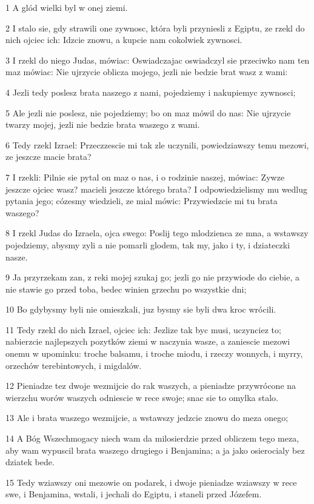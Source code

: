 \par 1 A glód wielki byl w onej ziemi.
\par 2 I stalo sie, gdy strawili one zywnosc, która byli przyniesli z Egiptu, ze rzekl do nich ojciec ich: Idzcie znowu, a kupcie nam cokolwiek zywnosci.
\par 3 I rzekl do niego Judas, mówiac: Oswiadczajac oswiadczyl sie przeciwko nam ten maz mówiac: Nie ujrzycie oblicza mojego, jezli nie bedzie brat wasz z wami:
\par 4 Jezli tedy poslesz brata naszego z nami, pojedziemy i nakupiemyc zywnosci;
\par 5 Ale jezli nie poslesz, nie pojedziemy; bo on maz mówil do nas: Nie ujrzycie twarzy mojej, jezli nie bedzie brata waszego z wami.
\par 6 Tedy rzekl Izrael: Przeczzescie mi tak zle uczynili, powiedziawszy temu mezowi, ze jeszcze macie brata?
\par 7 I rzekli: Pilnie sie pytal on maz o nas, i o rodzinie naszej, mówiac: Zywze jeszcze ojciec wasz? macieli jeszcze którego brata? I odpowiedzielismy mu wedlug pytania jego; cózesmy wiedzieli, ze mial mówic: Przywiedzcie mi tu brata waszego?
\par 8 I rzekl Judas do Izraela, ojca swego: Poslij tego mlodzienca ze mna, a wstawszy pojedziemy, abysmy zyli a nie pomarli glodem, tak my, jako i ty, i dziateczki nasze.
\par 9 Ja przyrzekam zan, z reki mojej szukaj go; jezli go nie przywiode do ciebie, a nie stawie go przed toba, bedec winien grzechu po wszystkie dni;
\par 10 Bo gdybysmy byli nie omieszkali, juz bysmy sie byli dwa kroc wrócili.
\par 11 Tedy rzekl do nich Izrael, ojciec ich: Jezlize tak byc musi, uczynciez to; nabierzcie najlepszych pozytków ziemi w naczynia wasze, a zaniescie mezowi onemu w upominku: troche balsamu, i troche miodu, i rzeczy wonnych, i myrry, orzechów terebintowych, i migdalów.
\par 12 Pieniadze tez dwoje wezmijcie do rak waszych, a pieniadze przywrócone na wierzchu worów waszych odniescie w rece swoje; snac sie to omylka stalo.
\par 13 Ale i brata waszego wezmijcie, a wstawszy jedzcie znowu do meza onego;
\par 14 A Bóg Wszechmogacy niech wam da milosierdzie przed obliczem tego meza, aby wam wypuscil brata waszego drugiego i Benjamina; a ja jako osierocialy bez dziatek bede.
\par 15 Tedy wziawszy oni mezowie on podarek, i dwoje pieniadze wziawszy w rece swe, i Benjamina, wstali, i jechali do Egiptu, i staneli przed Józefem.
